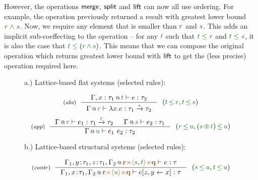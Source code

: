 However, the operations $\textnormal{\sffamily merge}$, $\textnormal{\sffamily split}$ and $\textnormal{\sffamily lift}$ can now all
use ordering. For example, the  operation previously returned
a result with greatest lower bound $\cclrd{r}\;\czip\;\cclrd{s}$. Now, we require any
element that is smaller than $\cclrd{r}$ and $\cclrd{s}$. This adds an implicit sub-coeffecting
to the operation -- for any $\cclrd{t}$ such that $\cclrd{t}\;\cleq\;\cclrd{r}$ and 
$\cclrd{t}\;\cleq\;\cclrd{s}$, it is also the case that $\cclrd{t}\;\cleq\;(\cclrd{r}\,\czip\,\cclrd{s})$.
This means that we can compose the original  operation which returns greatest lower
bound with $\textnormal{\sffamily lift}$ to get the (less precise) operation required here.


\begin{figure}[t]
{\small a.) Lattice-based flat systems (selected rules):}

\begin{equation*}
\tyrule{abs}
  {\coctx{\Gamma, x:\tau_1}{\cclrd{t}} \vdash e : \tau_2}
  {\coctx{\Gamma}{\cclrd{r}} \vdash \lambda x.e : \tau_1 \xrightarrow{\cclrd{s}} \tau_2 }
~~(\cclrd{t}\,\cleq\,\cclrd{r}, \cclrd{t}\,\cleq\,\cclrd{s})
\end{equation*}
\begin{equation*}
\tyrule{app}
  {\coctx{\Gamma}{\cclrd{r}} \vdash e_1 : \tau_1 \xrightarrow{\cclrd{t}} \tau_2 &
   \coctx{\Gamma}{\cclrd{s}} \vdash e_2 : \tau_1 }
  {\coctx{\Gamma}{\cclrd{u}} \vdash e_1~e_2 : \tau_2}
~~(\cclrd{r}\,\cleq\,\cclrd{u}, (\cclrd{s} \,\cseq\, \cclrd{t})\,\cleq\,\cclrd{u})
\end{equation*}

\vspace{1.5em}
{\small b.) Lattice-based structural systems (selected rules):}

\begin{equation*}
\tyrule{contr}
  {\coctx{\Gamma_1,y\!:\!\tau_1,z\!:\!\tau_1,\Gamma_2}{\aclrd{\textbf{r}} \atimes \alift{\cclrd{s},\cclrd{t}} \atimes \aclrd{\textbf{q}}} \vdash e : \tau}
  {\coctx{\Gamma_1,x\!:\!\tau_1,\Gamma_2}{\aclrd{\textbf{r}} \atimes \alift{\cclrd{u}} \atimes \aclrd{\textbf{q}}} \vdash \subst{e}{z,y}{x} : \tau}
~~(\cclrd{s}\,\cleq\,\cclrd{u}, \cclrd{t}\,\cleq\,\cclrd{u})
\end{equation*}

\label{fig:unified-lattice-types}
\end{figure}

